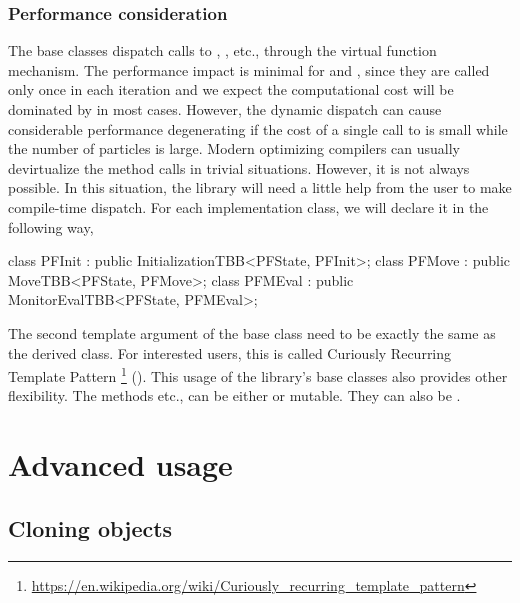\documentclass[11pt,bib,mint,hyper,altcolor]{marticle}
\begin{document}
\subsubsection{Performance consideration}
\label{sub:Performance consideration}

The base classes dispatch calls to , ,
etc., through the virtual function mechanism. The performance impact is minimal
for  and , since they are called only
once in each iteration and we expect the computational cost will be dominated
by  in most cases. However, the dynamic dispatch can cause
considerable performance degenerating if the cost of a single call to
 is small while the number of particles is large. Modern
optimizing compilers can usually devirtualize the method calls in trivial
situations. However, it is not always possible. In this situation, the library
will need a little help from the user to make compile-time dispatch. For each
implementation class, we will declare it in the following way,
\begin{cppcode}
  class PFInit : public InitializationTBB<PFState, PFInit>;
  class PFMove : public MoveTBB<PFState, PFMove>;
  class PFMEval : public MonitorEvalTBB<PFState, PFMEval>;
\end{cppcode}
The second template argument of the base class need to be exactly the same as
the derived class. For interested users, this is called Curiously Recurring
Template Pattern%
\footnote{\url{https://en.wikipedia.org/wiki/Curiously_recurring_template_pattern}}
(\crtp). This usage of the library's base classes also provides other
flexibility. The methods  etc., can be either
 or mutable. They can also be .

\section{Advanced usage}
\label{sec:Advanced usage}

\subsection{Cloning objects}
\label{sub:Cloning objects}
\end{document}
